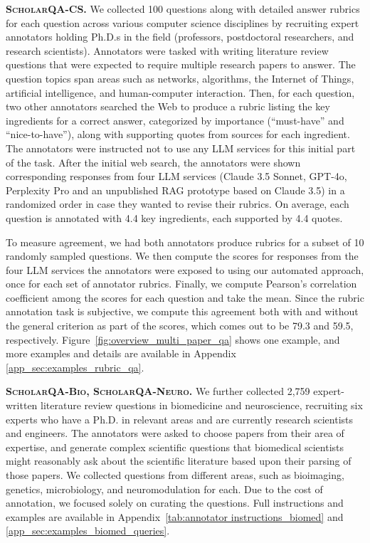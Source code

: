\documentclass{article} %
\renewcommand{\paragraph}[1]{\noindent \textbf{#1}}
\begin{document}
\paragraph{\textsc{ScholarQA-CS}.} 
We collected 100 questions along with detailed answer rubrics for each question across various computer science disciplines by recruiting expert annotators holding Ph.D.s in the field (professors, postdoctoral researchers, and research scientists). 
Annotators were tasked with writing literature review questions that were expected to require multiple research papers to answer. 
The question topics span areas such as networks, algorithms, the Internet of Things, artificial intelligence, and human-computer interaction. 
Then, for each question, two other annotators searched the Web to produce a rubric listing the key ingredients for a correct answer, categorized by importance (``must-have'' and ``nice-to-have''), along with supporting quotes from sources for each ingredient. {The annotators were instructed not to use any LLM services for this initial part of the task. After the initial web search, the annotators were shown corresponding responses from four LLM services {(Claude 3.5 Sonnet, GPT-4o, Perplexity Pro and an unpublished RAG prototype based on Claude 3.5)} in a randomized order in case they wanted to revise their rubrics.} On average, each question is annotated with 4.4 key ingredients, each supported by 4.4 quotes. 

{To measure agreement, we had both annotators produce rubrics for a subset of 10 randomly sampled questions. We then compute the scores for responses from the four LLM services the annotators were exposed to using our automated approach, once for each set of annotator rubrics. Finally, we compute Pearson's correlation coefficient among the scores for each question and take the mean. Since the rubric annotation task is subjective, we compute this agreement both with and without the general criterion as part of the scores, which comes out to be 79.3 and 59.5, respectively.}
Figure~\ref{fig:overview_multi_paper_qa} shows one example, and more examples and details are available in Appendix \ref{app_sec:examples_rubric_qa}. 

\paragraph{\textsc{ScholarQA-Bio}, \textsc{ScholarQA-Neuro}.}
We further collected 2,759 expert-written literature review questions in biomedicine and neuroscience, recruiting six experts who have a Ph.D. in relevant areas and are currently research scientists and engineers.  
{The annotators were asked to choose papers from their area of expertise,} and generate complex scientific questions that biomedical scientists might reasonably ask about the scientific literature {based upon their parsing of those papers}. We collected questions from different areas, such as bioimaging, genetics, microbiology, and neuromodulation for each.  
Due to the cost of annotation, we focused solely on curating the questions. 
Full instructions and examples are available in Appendix~\ref{tab:annotator instructions_biomed} and \ref{app_sec:examples_biomed_queries}. 
\end{document}
